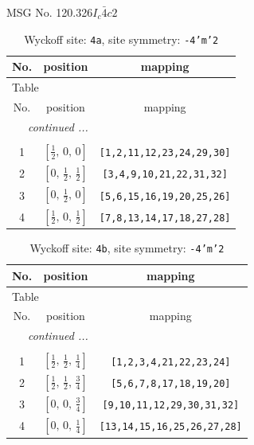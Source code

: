 \documentclass[fleqn,8pt]{jsarticle}
\begin{document}
\setcounter{MaxMatrixCols}{32}

\renewcommand{\tablename}{Table~}
\renewcommand{\figurename}{Figure~}
\begin{center}
\LARGE
MSG No. 120.326\quad$I_{c}\bar{4}c2$
\end{center}
\renewcommand{\arraystretch}{1.2}
\begin{longtable}{ccc}
\caption{Wyckoff site: {\tt 4a}, site symmetry: {\tt -4'm'2}}
 \\
 \hline \hline
No. & position & mapping \\ \hline \endfirsthead

\multicolumn{2}{l}{\tablename\ \thetable{}} \\
 \hline \hline
No. & position & mapping \\ \hline \endhead

 \hline \hline
\multicolumn{2}{r}{\footnotesize\it continued ...} \\ \endfoot

 \hline \hline
\multicolumn{2}{r}{} \\ \endlastfoot

1 & $\left[ \frac{1}{2},\, 0,\, 0 \right]$ & {\tt [1,2,11,12,23,24,29,30]} \\ \hline
2 & $\left[ 0,\, \frac{1}{2},\, \frac{1}{2} \right]$ & {\tt [3,4,9,10,21,22,31,32]} \\ \hline
3 & $\left[ 0,\, \frac{1}{2},\, 0 \right]$ & {\tt [5,6,15,16,19,20,25,26]} \\ \hline
4 & $\left[ \frac{1}{2},\, 0,\, \frac{1}{2} \right]$ & {\tt [7,8,13,14,17,18,27,28]} \\
\end{longtable}
\renewcommand{\arraystretch}{1.2}
\begin{longtable}{ccc}
\caption{Wyckoff site: {\tt 4b}, site symmetry: {\tt -4'm'2}}
 \\
 \hline \hline
No. & position & mapping \\ \hline \endfirsthead

\multicolumn{2}{l}{\tablename\ \thetable{}} \\
 \hline \hline
No. & position & mapping \\ \hline \endhead

 \hline \hline
\multicolumn{2}{r}{\footnotesize\it continued ...} \\ \endfoot

 \hline \hline
\multicolumn{2}{r}{} \\ \endlastfoot

1 & $\left[ \frac{1}{2},\, \frac{1}{2},\, \frac{1}{4} \right]$ & {\tt [1,2,3,4,21,22,23,24]} \\ \hline
2 & $\left[ \frac{1}{2},\, \frac{1}{2},\, \frac{3}{4} \right]$ & {\tt [5,6,7,8,17,18,19,20]} \\ \hline
3 & $\left[ 0,\, 0,\, \frac{3}{4} \right]$ & {\tt [9,10,11,12,29,30,31,32]} \\ \hline
4 & $\left[ 0,\, 0,\, \frac{1}{4} \right]$ & {\tt [13,14,15,16,25,26,27,28]} \\
\end{longtable}
\end{document}
